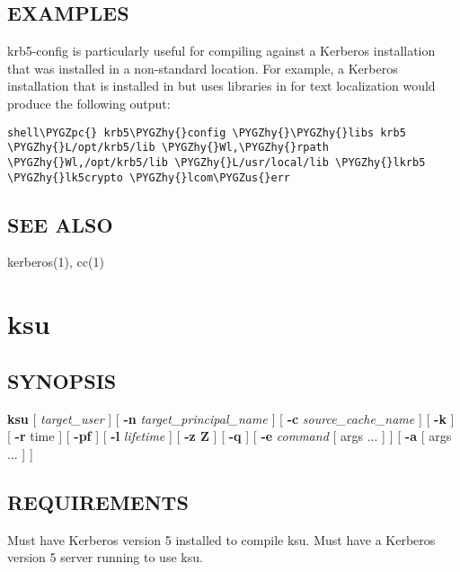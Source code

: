 \documentclass[letterpaper,10pt,english]{sphinxmanual}
\def\PYGZus{\char`\_}
\def\PYGZpc{\char`\%}
\def\PYGZhy{\char`\-}
\begin{document}
\subsection{EXAMPLES}
\label{user/user_commands/krb5-config:examples}
krb5-config is particularly useful for compiling against a Kerberos
installation that was installed in a non-standard location.  For example,
a Kerberos installation that is installed in  but uses
libraries in  for text localization would produce
the following output:

\begin{Verbatim}[commandchars=\\\{\}]
shell\PYGZpc{} krb5\PYGZhy{}config \PYGZhy{}\PYGZhy{}libs krb5
\PYGZhy{}L/opt/krb5/lib \PYGZhy{}Wl,\PYGZhy{}rpath \PYGZhy{}Wl,/opt/krb5/lib \PYGZhy{}L/usr/local/lib \PYGZhy{}lkrb5 \PYGZhy{}lk5crypto \PYGZhy{}lcom\PYGZus{}err
\end{Verbatim}


\subsection{SEE ALSO}
\label{user/user_commands/krb5-config:see-also}
kerberos(1), cc(1)


\section{ksu}
\label{user/user_commands/ksu:ksu-1}\label{user/user_commands/ksu:ksu}\label{user/user_commands/ksu::doc}

\subsection{SYNOPSIS}
\label{user/user_commands/ksu:synopsis}
\textbf{ksu}
{[} \emph{target\_user} {]}
{[} \textbf{-n} \emph{target\_principal\_name} {]}
{[} \textbf{-c} \emph{source\_cache\_name} {]}
{[} \textbf{-k} {]}
{[} \textbf{-r} time {]}
{[} \textbf{-pf} {]}
{[} \textbf{-l} \emph{lifetime} {]}
{[} \textbf{-z \textbar{} Z} {]}
{[} \textbf{-q} {]}
{[} \textbf{-e} \emph{command} {[} args ...  {]} {]} {[} \textbf{-a} {[} args ...  {]} {]}


\subsection{REQUIREMENTS}
\label{user/user_commands/ksu:requirements}
Must have Kerberos version 5 installed to compile ksu.  Must have a
Kerberos version 5 server running to use ksu.
\end{document}
